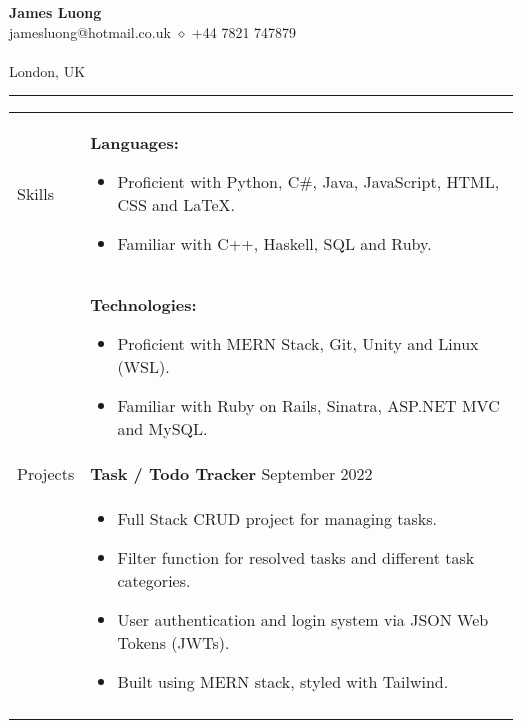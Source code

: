 \documentclass[12pt]{article}
\begin{document}
\begin{minipage}[t][0pt]{\linewidth} %
\begin{center}
	{\LARGE\textbf{James Luong}} \\
	jamesluong@hotmail.co.uk $\diamond$ +44 7821 747879 \\
	
	\href{https://jluong23.github.io/blog}{\color{Blue}{jluong23.github.io/blog}} \\
	
	London, UK \\
	\hrule
\end{center}


\begin{tabular}[t]{p{2cm} p{14cm}}
	{Skills} &
		\textbf{Languages:} 
	    \begin{itemize}
    		\renewcommand{\labelitemi}{$\diamond$}
    			\item Proficient with Python, C\#, Java, JavaScript, HTML, CSS and \LaTeX. 
    			\item Familiar with C++, Haskell, SQL and Ruby.
		\end{itemize} \\ &

		\textbf{Technologies:} 
	    \begin{itemize}
    		\renewcommand{\labelitemi}{$\diamond$}
    			\item Proficient with MERN Stack, Git, Unity and Linux (WSL).
    			\item Familiar with Ruby on Rails, Sinatra, ASP.NET MVC and MySQL.
		\end{itemize} \\

	{Projects} &
		\textbf{Task / Todo Tracker}  \hfill September 2022 \\ &
		\begin{itemize}
			\renewcommand{\labelitemi}{$\diamond$}
			\item Full Stack CRUD project for managing tasks.
			\item Filter function for resolved tasks and different task categories.
			\item User authentication and login system via JSON Web Tokens (JWTs).
			\item Built using MERN stack, styled with Tailwind.
		\end{itemize} \\ &
		

\end{tabular}
\end{minipage}
\end{document}
